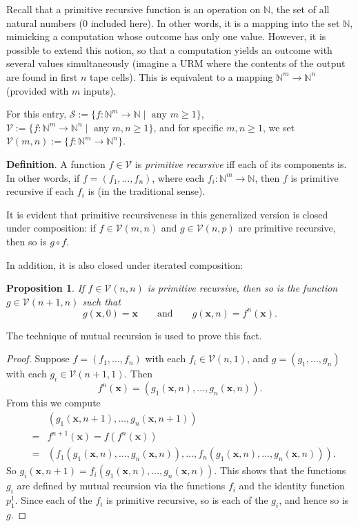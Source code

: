 \documentclass[12pt]{article}
\newtheorem{prop}{Proposition}
\begin{document}
Recall that a primitive recursive function is an operation on $\mathbb{N}$, the set of all natural numbers ($0$ included here).  In other words, it is a mapping into the set $\mathbb{N}$, mimicking a computation whose outcome has only one value.  However, it is possible to extend this notion, so that a computation yields an outcome with several values simultaneously (imagine a URM where the contents of the output are found in first $n$ tape cells).  This is equivalent to a mapping $\mathbb{N}^m \to \mathbb{N}^n$ (provided with $m$ inputs).

For this entry, $\mathcal{S}:=\lbrace f:\mathbb{N}^m \to \mathbb{N} \mid \mbox{ any } m\ge 1\rbrace$, $\mathcal{V}:=\lbrace f: \mathbb{N}^m \to \mathbb{N}^n \mid \mbox{ any } m,n\ge 1\rbrace$, and for specific $m,n\ge 1$, we set $\mathcal{V}(m,n):=\lbrace f: \mathbb{N}^m \to \mathbb{N}^n \rbrace$.

\textbf{Definition}.  A function $f\in \mathcal{V}$ is \emph{primitive recursive} iff each of its components is.  In other words, if $f=(f_1,\ldots, f_n)$, where each $f_i: \mathbb{N}^m \to \mathbb{N}$, then $f$ is primitive recursive if each $f_i$ is (in the traditional sense).

It is evident that primitive recursiveness in this generalized version is closed under composition: if $f\in \mathcal{V}(m,n)$ and $g\in \mathcal{V}(n,p)$ are primitive recursive, then so is $g\circ f$.

In addition, it is also closed under iterated composition:
\begin{prop}  If $f \in \mathcal{V}(n,n)$ is primitive recursive, then so is the function $g\in \mathcal{V}(n+1,n)$ such that
$$g(\boldsymbol{x},0) = \boldsymbol{x} \qquad \mbox{and} \qquad g(\boldsymbol{x},n) = f^n(\boldsymbol{x}).$$
\end{prop}
The technique of mutual recursion is used to prove this fact.
\begin{proof}
Suppose $f=(f_1,\ldots,f_n)$ with each $f_i\in \mathcal{V}(n,1)$, and $g=(g_1,\ldots, g_n)$ with each $g_i \in \mathcal{V}(n+1,1)$.  Then $$f^n(\boldsymbol{x})=(g_1(\boldsymbol{x},n),\ldots, g_n(\boldsymbol{x},n)).$$  
From this we compute
\begin{eqnarray*}
&& (g_1(\boldsymbol{x},n+1),\ldots, g_n(\boldsymbol{x},n+1)) \\ &=& f^{n+1}(
\boldsymbol{x})=f(f^n(\boldsymbol{x})) \\ &=& (f_1(g_1(\boldsymbol{x},n),\ldots, g_n(\boldsymbol{x},n)), \ldots, f_n(g_1(\boldsymbol{x},n),\ldots, g_n(\boldsymbol{x},n))).
\end{eqnarray*}
So $g_i(\boldsymbol{x},n+1)=f_i(g_1(\boldsymbol{x},n),\ldots, g_n(\boldsymbol{x},n))$.  This shows that the functions $g_i$ are defined by mutual recursion via the functions $f_i$ and the identity function $p_1^1$.  Since each of the $f_i$ is primitive recursive, so is each of the $g_i$, and hence so is $g$.
\end{proof}
\end{document}
